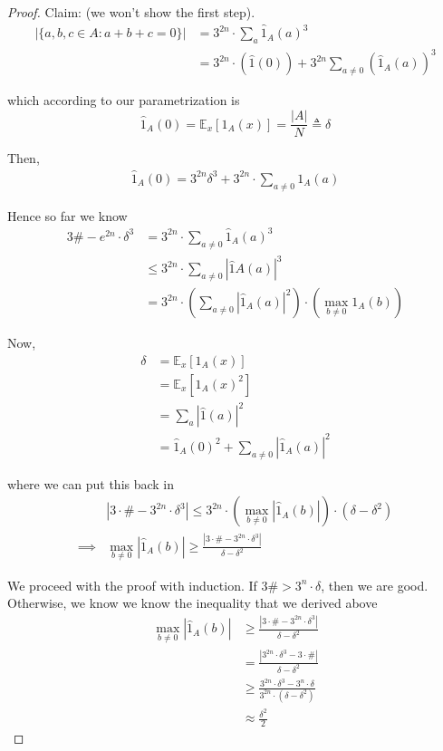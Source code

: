 \begin{proof}
    Claim: (we won't show the first step).
    \begin{align}
        |\{a, b, c \in A : a + b + c = 0 \}| 
        &= 3^{2n} \cdot \sum_a \hat 1 _A (a)^3 \\
        &= 3^{2n} \cdot (\hat 1 (0)) + 3^{2n} \sum_{a \neq 0} (\hat 1 _A (a))^3
    \end{align}
    
    which according to our parametrization is 
    \begin{equation}
        \hat 1 _A(0) = \mathbb E _x [ 1_A(x)] = \frac{|A|}{N} \triangleq \delta
    \end{equation}
    
    Then, 
    \begin{align}
        \hat 1 _A(0) = 3^{2n} \delta^3 + 3^{2n} \cdot \sum_{a \neq 0} 1_A (a)
    \end{align}
    
    Hence so far we know 
    \begin{align}
        3\# - e^{2n} \cdot \delta ^3 
        &= 3^{2n} \cdot \sum_{a \neq 0} \hat 1_A(a)^3 \\
        &\leq 3^{2n} \cdot \sum_{a \neq 0} |\hat 1 A(a)|^3 \\
        &= 3^{2n} \cdot \left(\sum_{a \neq 0} |\hat 1_A (a)| ^2\right) \cdot \left(\max_{b \neq 0} 1_A(b)\right)
    \end{align}
    
    Now, 
    \begin{align}
        \delta
        &= \mathbb E_x [1_A(x)] \\
        &= \mathbb E_x [1_A(x)^2] \\
        &= \sum_a |\hat 1 (a)|^2 \\
        &= \hat 1 _A(0)^2 + \sum_{a \neq 0} |\hat 1 _A (a)|^2 
    \end{align}
    
    where we can put this back in
    \begin{align}
        &|3 \cdot \# -3^{2n} \cdot \delta^3|
        \leq 3^{2n} \cdot \left( \max_{b \neq 0} |\hat 1 _A(b)| \right) \cdot (\delta - \delta^2 ) \\
        \implies & \max_{b \neq 0} |\hat 1 _A(b)| \geq \frac{|3 \cdot \# -3^{2n} \cdot \delta^3|}{\delta - \delta^2}
    \end{align}
    
    We proceed with the proof with induction. If $3\# > 3^n \cdot \delta$, then we are good. Otherwise, we know we know the inequality that we derived above 
    \begin{align}
        \max_{b \neq 0} |\hat 1 _A(b)| 
        &\geq \frac{|3 \cdot \# -3^{2n} \cdot \delta^3|}{\delta - \delta^2} \\
        &= \frac{|3^{2n} \cdot \delta^3 - 3 \cdot \#|}{\delta - \delta^2} \\
        &\geq \frac{3^{2n} \cdot \delta^3 - 3^n\cdot \delta}{3^{2n} \cdot (\delta - \delta^2)} \\
        &\approx \frac{\delta^2}{2}
    \end{align}
    

\end{proof}
